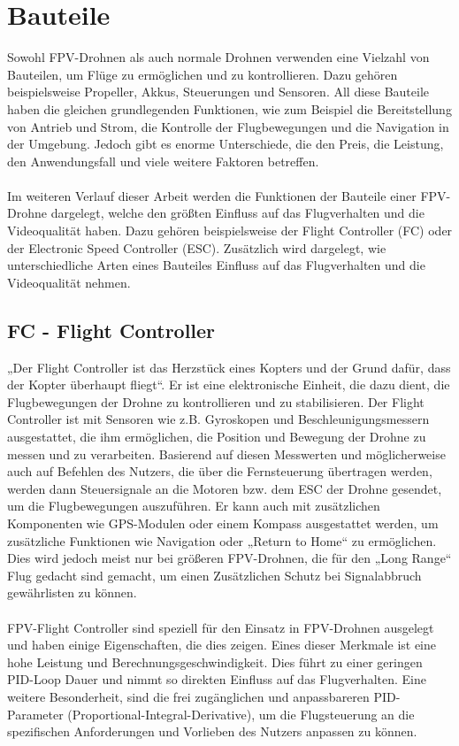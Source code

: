 \section[Bauteile]{Bauteile}
    Sowohl FPV-Drohnen als auch normale Drohnen verwenden eine Vielzahl von Bauteilen, um Flüge zu ermöglichen und zu kontrollieren. Dazu gehören beispielsweise Propeller, Akkus, Steuerungen und Sensoren. All diese Bauteile haben die gleichen grundlegenden Funktionen, wie zum Beispiel die Bereitstellung von Antrieb und Strom, die Kontrolle der Flugbewegungen und die Navigation in der Umgebung. Jedoch gibt es enorme Unterschiede, die den Preis, die Leistung, den Anwendungsfall und viele weitere Faktoren betreffen.
    \\ \\
    Im weiteren Verlauf dieser Arbeit werden die Funktionen der Bauteile einer FPV-Drohne dargelegt, welche den größten Einfluss auf das Flugverhalten und die Videoqualität haben. Dazu gehören beispielsweise der Flight Controller (FC) oder der Electronic Speed Controller (ESC). Zusätzlich wird dargelegt, wie unterschiedliche Arten eines Bauteiles Einfluss auf das Flugverhalten und die Videoqualität nehmen.

\subsection[FC - Flight Controller]{FC - Flight Controller}
    „Der Flight Controller ist das Herzstück eines Kopters und der Grund dafür, dass der Kopter überhaupt fliegt“. Er ist eine elektronische Einheit, die dazu dient, die Flugbewegungen der Drohne zu kontrollieren und zu stabilisieren. Der Flight Controller ist mit Sensoren wie z.B. Gyroskopen und Beschleunigungsmessern ausgestattet, die ihm ermöglichen, die Position und Bewegung der Drohne zu messen und zu verarbeiten. Basierend auf diesen Messwerten und möglicherweise auch auf Befehlen des Nutzers, die über die Fernsteuerung übertragen werden, werden dann Steuersignale an die Motoren bzw. dem ESC der Drohne gesendet, um die Flugbewegungen auszuführen. Er kann auch mit zusätzlichen Komponenten wie GPS-Modulen oder einem Kompass ausgestattet werden, um zusätzliche Funktionen wie Navigation oder „Return to Home“ zu ermöglichen. Dies wird jedoch meist nur bei größeren FPV-Drohnen, die für den „Long Range“ Flug gedacht sind gemacht, um einen Zusätzlichen Schutz bei Signalabbruch gewährlisten zu können.
    \\ \\
    FPV-Flight Controller sind speziell für den Einsatz in FPV-Drohnen ausgelegt und haben einige Eigenschaften, die dies zeigen. Eines dieser Merkmale ist eine hohe Leistung und Berechnungsgeschwindigkeit. Dies führt zu einer geringen PID-Loop Dauer und nimmt so direkten Einfluss auf das Flugverhalten. Eine weitere Besonderheit, sind die frei zugänglichen und anpassbareren PID-Parameter (Proportional-Integral-Derivative), um die Flugsteuerung an die spezifischen Anforderungen und Vorlieben des Nutzers anpassen zu können.

